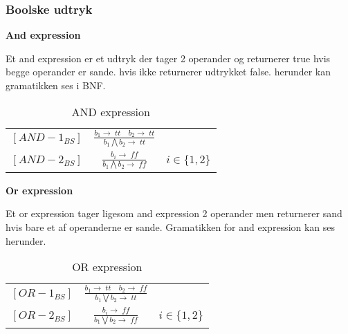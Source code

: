 \subsubsection{Boolske udtryk}

\textbf{And expression}

\noindent Et and expression er et udtryk der tager 2 operander og returnerer true hvis begge operander er sande. hvis ikke returnerer udtrykket false.
herunder kan gramatikken ses i BNF.



    \bgroup
    \def\arraystretch{3}
    \begin{table}[H]
    \centering
    \begin{tabular}{l c l}
        
        $[AND-1_{BS}]$ &$\frac{b_1 \rightarrow \; tt \quad b_2 \rightarrow \; tt}{b_1 \bigwedge b_2 \rightarrow \; tt}$ & \\
    
        $[AND-2_{BS}]$ &$\frac{b_i \rightarrow \; ff}{b_1 \bigwedge b_2 \rightarrow \; ff}$ & $i \in \{1, 2\}$\\
        
    \end{tabular}
    \caption{AND expression}
    \label{tab:andexpr}
    \end{table}
    \egroup

\noindent \textbf{Or expression}

Et or expression tager ligesom and expression 2 operander men returnerer sand hvis bare et af operanderne er sande. Gramatikken for and expression kan ses herunder.



    \bgroup
    \def\arraystretch{3}
    \begin{table}[H]
    \centering
    \begin{tabular}{l c l}
        
        $[OR-1_{BS}]$ &$\frac{b_1 \rightarrow \; tt \quad b_2 \rightarrow \; ff}{b_1 \bigvee b_2 \rightarrow \; tt}$ & \\
    
        $[OR-2_{BS}]$ &$\frac{b_i \rightarrow \; ff}{b_1 \bigvee b_2 \rightarrow \; ff}$ & $i \in \{1, 2\}$\\
        
    \end{tabular}
    \caption{OR expression}
    \label{tab:orexpr}
    \end{table}
    \egroup
    
